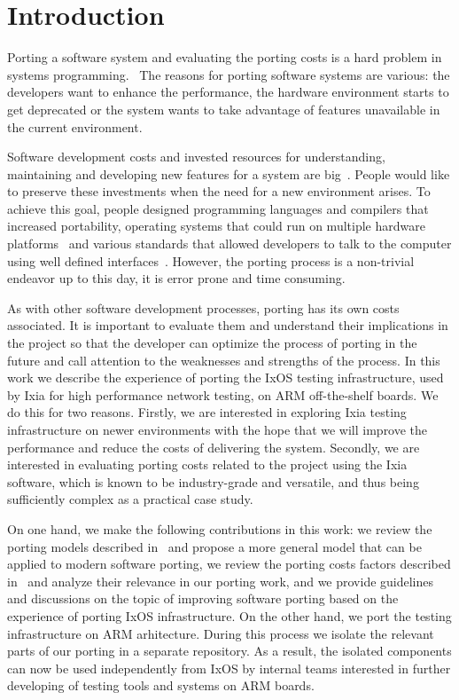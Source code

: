 \chapter{Introduction}\pagestyle{fancy}

Porting a software system and evaluating the porting costs is a hard problem in
systems
programming.~\cite{tanaka,hakuta,mooney2004developing,kanai,porquet2015,
bodenstab1984unix,osdevcrossport,jolitz1990porting,frakes1995sixteen,
tanenbaum1978guidelines,johnson1978unix}
The reasons for porting software systems are various: the developers want to
enhance the performance, the hardware environment starts to get deprecated or
the system wants to take advantage of features unavailable in the current
environment.

Software development costs and invested resources for understanding, maintaining
and developing new features for a system are
big~\cite{xia2017measuring,boehm2000software,morgan1994controlling}. People would
like to preserve these investments when the need for a new environment arises.
To achieve this goal, people designed programming languages and compilers that
increased portability, operating systems that could run on multiple hardware
platforms~\cite{johnson1978unix} and various standards that allowed developers to talk to
the computer using well defined interfaces~\cite{walli1995posix}. However, the porting
process is a non-trivial endeavor up to this day, it is error prone and time
consuming.

As with other software development processes, porting has its own costs
associated. It is important to evaluate them and understand their implications
in the project so that the developer can optimize the process of porting in the
future and call attention to the weaknesses and strengths of the process. In
this work we describe the experience of porting the IxOS testing infrastructure,
used by Ixia for high performance network testing, on ARM off-the-shelf boards.
We do this for two reasons. Firstly, we are interested in exploring Ixia testing
infrastructure on newer environments with the hope that we will improve the
performance and reduce the costs of delivering the system. Secondly, we are
interested in evaluating porting costs related to the project using the Ixia
software, which is known to be industry-grade and versatile, and thus being
sufficiently complex as a practical case study.

On one hand, we make the following contributions in this work: we review the
porting models described in~\cite{tanaka,hakuta,kanai} and propose a more
general model that can be applied to modern software porting, we review the
porting costs factors described in~\cite{hakuta} and analyze their relevance in
our porting work, and we provide guidelines and discussions on the topic of
improving software porting based on the experience of porting IxOS
infrastructure. On the other hand, we port the testing infrastructure on ARM
arhitecture. During this process we isolate the relevant parts of our porting
in a separate repository. As a result, the isolated components can now be used
independently from IxOS by internal teams interested in further developing of
testing tools and systems on ARM boards.

